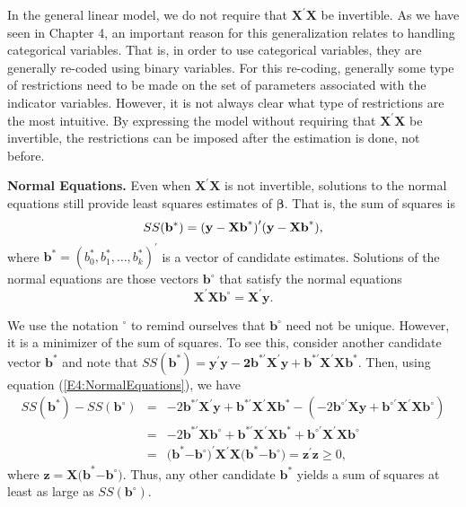 In the general linear model, we do not require that
$\mathbf{X}^{\prime }\mathbf{X}$ be invertible. As we have seen in
Chapter 4, an important reason for this generalization relates to
handling categorical variables. That is, in order to use categorical
variables, they are generally re-coded using binary variables. For
this re-coding, generally some type of restrictions need to be made
on the set of parameters associated with the indicator variables.
However, it is not always clear what type of restrictions are the
most intuitive. By expressing the model without requiring that $\mathbf{X}%
^{\prime }\mathbf{X}$ be invertible, the restrictions can be imposed after
the estimation is done, not before.

\textbf{Normal Equations.} Even when $\mathbf{X}^{\prime
}\mathbf{X}$ is not invertible, solutions to the normal equations
still provide least squares estimates of $\boldsymbol \beta $. That
is, the sum of squares is
\begin{equation*}
SS(\mathbf{b}^{\ast })=\mathbf{(y-Xb}^{\ast }\mathbf{)}^{\prime }\mathbf{%
(y-Xb}^{\ast }\mathbf{),}
\end{equation*}
where $\mathbf{b}^{\ast }=(b_{0}^{\ast },b_{1}^{\ast
},\ldots,b_{k}^{\ast })^{\prime }$ is a vector of candidate
estimates. Solutions of the normal equations are those vectors
$\mathbf{b}^{\circ }$ that satisfy the normal equations
\begin{equation}\label{E4:NormalEquations}
\mathbf{X}^{\prime }\mathbf{Xb}^{\circ }=\mathbf{X}^{\prime }\mathbf{y.}%
\end{equation}

\noindent We use the notation $^{\circ }$ to remind ourselves that
$\mathbf{b}^{\circ }$ need not be unique. However, it is a minimizer
of the sum of squares. To see
this, consider another candidate vector $\mathbf{b}^{\ast }$ and note that $SS(%
\mathbf{b}^{\ast })=\mathbf{y}^{\prime }\mathbf{y-2b}^{\ast \prime }\mathbf{X%
}^{\prime }\mathbf{y+b}^{\ast \prime }\mathbf{X}^{\prime
}\mathbf{Xb}^{\ast } $. Then, using equation
(\ref{E4:NormalEquations}), we have
\begin{eqnarray*}
SS(\mathbf{b}^{\ast })-SS(\mathbf{b}^{\circ }) &=&-2\mathbf{b}^{\ast \prime }%
\mathbf{X}^{\prime }\mathbf{y}+\mathbf{b}^{\ast \prime }\mathbf{X}^{\prime }%
\mathbf{Xb}^{\ast }-(-2\mathbf{b}^{\circ \prime }\mathbf{Xy}+\mathbf{b}%
^{\circ \prime }\mathbf{X}^{\prime }\mathbf{Xb}^{\circ }) \\
&=&-2\mathbf{b}^{\ast \prime }\mathbf{Xb}^{\circ }+\mathbf{b}^{\ast \prime }%
\mathbf{X}^{\prime }\mathbf{Xb}^{\ast }+\mathbf{b}^{\circ \prime }\mathbf{X}%
^{\prime }\mathbf{Xb}^{\circ } \\
&=&\mathbf{(b}^{\ast }\mathbf{-b}^{\circ }\mathbf{)}^{\prime }\mathbf{X}%
^{\prime }\mathbf{X(b}^{\ast }\mathbf{-b}^{\circ }\mathbf{)}=\mathbf{z}%
^{\prime }\mathbf{z}\geq 0,
\end{eqnarray*}
\noindent where $\mathbf{z}=\mathbf{X(b}^{\ast }\mathbf{-b}^{\circ
}\mathbf{)}$. Thus, any other candidate $\mathbf{b}^{\ast }$ yields
a sum of squares at least as large as $SS(\mathbf{b}^{\circ })$.

